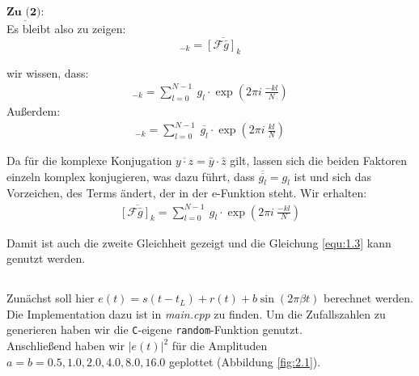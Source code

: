 \documentclass[ngerman]{scrartcl}
\begin{document}
$\underline{\textbf{Zu (2):}}$\\
Es bleibt also zu zeigen:
\begin{equation*}
	[\mathcal{F} g]_{-k}= \overline{[\mathcal{F} \bar{g}]_{k}}
\end{equation*}

wir wissen, dass:
\begin{align*}
	[\mathcal{F} g]_{-k}= \sum_{l=0}^{N-1} ~ g_l \cdot \exp (2 \pi i ~\frac{-kl}{N})
\end{align*}
Außerdem:
\begin{align*}
[\mathcal{F} \overline{g}]_{-k}= \sum_{l=0}^{N-1} ~ \overline{g_l} \cdot \exp (2 \pi i ~\frac{kl}{N})
\end{align*}

Da für die komplexe Konjugation $\overline{y \cdot z}=\bar{y} \cdot \bar{z}$ gilt, lassen sich die beiden Faktoren einzeln komplex konjugieren, was dazu führt, dass $\overline{\overline{g_l}}=g_l$ ist und sich das Vorzeichen, des Terms ändert, der in der e-Funktion steht. Wir erhalten:
\begin{align*}
	\overline{[\mathcal{F} \bar{g}]_{k}}=\sum_{l=0}^{N-1} ~ g_l \cdot \exp (2 \pi i ~\frac{-kl}{N})
\end{align*}


Damit ist auch die zweite Gleichheit gezeigt und die Gleichung \ref{equ:1.3} kann genutzt werden.


\subsection{}
\label{ssec:10.2}

Zunächst soll hier $e(t)=s\left(t-t_{L}\right)+r(t)+b \sin (2 \pi \beta t)$ berechnet werden. Die Implementation dazu ist in \emph{main.cpp} zu finden. Um die Zufallszahlen zu generieren haben wir die \verb|C|-eigene \verb|random|-Funktion genutzt.\\
Anschließend haben wir $|e(t)|^2$ für die Amplituden $a=b=0.5, 1.0, 2.0, 4.0, 8.0, 16.0$ geplottet (Abbildung \ref{fig:2.1}).
\end{document}
